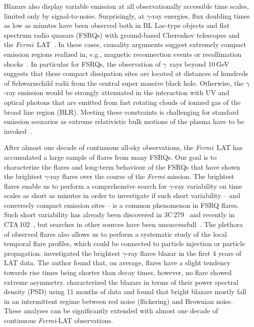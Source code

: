\documentclass[twocolumn]{aastex62}
\newcommand{\Grays}{$\gamma$~rays\xspace}
\newcommand{\gray}{$\gamma$-ray\xspace}
\newcommand{\Fermi}{\emph{Fermi}\xspace}
\newcommand{\FermiLAT}{\emph{Fermi}~LAT\xspace}
\newcommand{\fermiLAT}{\emph{Fermi}-LAT\xspace}
\begin{document}
Blazars also display variable emission at all observationally accessible time scales, limited only by signal-to-noise.
Surprisingly, at \gray energies, flux doubling times as low as minutes have been observed both in BL Lac-type objects and flat spectrum radio quasars (FSRQs) with ground-based Cherenkov telescopes and the \FermiLAT~\cite[e.g.][]{pks2155hess2007,pks1222magic2011,TheFermi-LAT:2016dss}.
In these cases, causality arguments suggest extremely compact emission regions realized in, e.g., magnetic reconnection events or recollimation shocks~\cite[e.g.][]{Petropoulou:2016xat,Bodo:2017qqn}.
In particular for FSRQs, the observation of \Grays beyond 10\,GeV suggests that these compact dissipation sites are located at distances of hundreds of Schwarzschild  radii from the central super massive black hole. 
Otherwise, the \gray emission would be strongly attenuated in the interaction with UV and optical photons that are emitted from fast rotating clouds of ionized gas of the broad line region (BLR). 
Meeting these constraints is challenging for standard emission scenarios as extreme relativistic bulk motions of the plasma have to be invoked~\cite[e.g.,][]{TheFermi-LAT:2016dss}. 

After almost one decade of continuous all-sky observations, the \FermiLAT has accumulated a large sample of flares from many FSRQs.
Our goal is to characterize the flares and long-term behaviour of the FSRQs that have shown the brightest \gray flares over the course of the \Fermi mission. 
The brightest flares enable us to perform a comprehensive search for \gray variability on time scales as short as minutes in order to investigate if such short variability -- and conversely compact emission sites -- is a common phenomenon 
in FSRQ flares. 
Such short variability has already been discovered in 3C\,279~\citep{TheFermi-LAT:2016dss} and recently in CTA\,102~\citep{2018ApJ...854L..26S}, but searches in other sources have been unsuccessfull~\citep{2017Galax...5..100N}.
The plethora of observed flares also allows us to perform a systematic study of the local temporal flare profiles, which could be connected to particle injection or particle propagation.
\citet{2013MNRAS.430.1324N} investigated the brightest \gray flares blazar in the first 4 years of LAT data.
The author found that, on average, flares have a slight tendency towards rise times being shorter than decay times, however, no flare showed extreme asymmetry. 
\citet{2010ApJ...722..520A} characterized the blazars in terms of their power spectral density (PSD) using 11 months of data and found that bright blazars mostly fall in an intermittent regime between red noise (flickering) and Brownian noise. 
These analyses can be significantly extended with almost one decade of continuous \fermiLAT observations.
\end{document}
